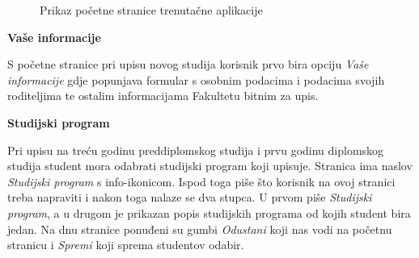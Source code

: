 \documentclass[times, utf8, zavrsni, numeric]{fer}
\begin{document}
        \begin{figure} [H]
          \centering
          \caption{Prikaz početne stranice trenutačne aplikacije}
        \end{figure}
        
        \noindent\textbf{Vaše informacije}
        
        S početne stranice pri upisu novog studija korisnik prvo bira opciju \textit{Vaše informacije} gdje popunjava formular s osobnim podacima i podacima svojih roditeljima te ostalim informacijama Fakultetu bitnim za upis.
        
        \noindent\textbf{Studijski program}
        
        Pri upisu na treću godinu preddiplomskog studija i prvu godinu diplomskog studija student mora odabrati studijski program koji upisuje. Stranica ima naslov \textit{Studijski program} s info-ikonicom. Ispod toga piše što korisnik na ovoj stranici treba napraviti i nakon toga nalaze se dva stupca. U prvom piše \textit{Studijski program}, a u drugom je prikazan popis studijskih programa od kojih student bira jedan. Na dnu stranice ponuđeni su gumbi \textit{Odustani} koji nas vodi na početnu stranicu i \textit{Spremi} koji sprema studentov odabir.
        
\end{document}
